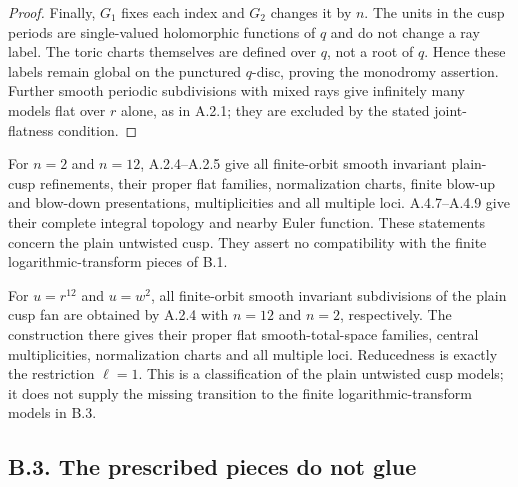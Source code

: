 \begin{proof}
Finally, $G_1$ fixes each index and $G_2$ changes it
by $n$. The units in the cusp periods are
single-valued holomorphic functions of $q$ and do
not change a ray label. The toric charts themselves
are defined over $q$, not a root of $q$. Hence
these labels remain global on the punctured
$q$-disc, proving the monodromy assertion. Further
smooth periodic subdivisions with mixed rays give
infinitely many models flat over $r$ alone, as in
A.2.1; they are excluded by the stated joint-flatness
condition.
\end{proof}

\begin{corollary}\label{push:src:B.2.2}\label{push:B22}
For $n=2$ and $n=12$, A.2.4--A.2.5 give all
finite-orbit smooth invariant plain-cusp refinements,
their proper flat families, normalization charts,
finite blow-up and blow-down presentations,
multiplicities and all multiple loci. A.4.7--A.4.9
give their complete integral topology and nearby
Euler function. These statements concern the plain
untwisted cusp. They assert no compatibility with
the finite logarithmic-transform pieces of B.1.
\end{corollary}

\begin{corollary}\label{push:src:B.2.3}\label{push:B23}
For $u=r^{12}$ and $u=w^2$, all finite-orbit smooth invariant
subdivisions of the plain cusp fan are obtained by A.2.4
with $n=12$ and $n=2$, respectively. The construction there
gives their proper flat smooth-total-space families,
central multiplicities, normalization charts and all
multiple loci. Reducedness is exactly the restriction
$\ell=1$. This is a classification of the plain untwisted
cusp models; it does not supply the missing transition to
the finite logarithmic-transform models in B.3.
\end{corollary}

\subsection{B.3. The prescribed pieces do not glue}

